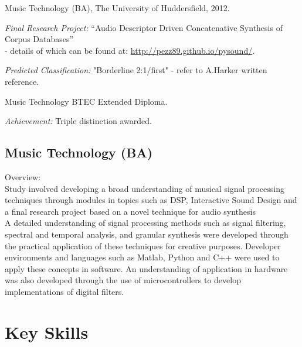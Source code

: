 \documentclass[10pt,letterpaper]{article}
\renewenvironment{itemize}{
  \begin{list}{}{
    \setlength{\leftmargin}{1.5em}
    \setlength{\itemsep}{0.25em}
    \setlength{\parskip}{0pt}
    \setlength{\parsep}{0.25em}
  }
}{
  \end{list}
}
\begin{document}
\begin{itemize}
    \item Music Technology (BA), The University of Huddersfield, 2012.
    \begin{itemize}
    \item \emph{Final Research Project:} ``Audio Descriptor Driven
        Concatenative Synthesis of Corpus Databases'' \\
        - details of which can be found at:
        \href{http://pezz89.github.io/pysound/}{http://pezz89.github.io/pysound/}.
    \item \emph{Predicted Classification:} "Borderline 2:1/first" - refer to
        A.Harker written reference.
    \end{itemize}
  \item Music Technology BTEC Extended Diploma.
    \begin{itemize}
    \item \emph{Achievement:} Triple distinction awarded.
    \end{itemize}
\end{itemize}

\subsection*{Music Technology (BA)}
    Overview: \\
    Study involved developing a broad understanding of musical signal
    processing techniques through modules in topics such as DSP, Interactive
    Sound Design and a final research project based on a novel technique for
    audio synthesis  \\
    A detailed understanding of signal processing methods such as signal filtering,
    spectral and temporal analysis, and granular synthesis were developed
    through the practical application of these techniques for creative
    purposes. Developer environments and languages such as Matlab, Python and
    C++ were used to apply these concepts in software. An understanding of
    application in hardware was also developed through the use of
    microcontrollers to develop implementations of digital filters.


\section*{Key Skills}
\end{document}

